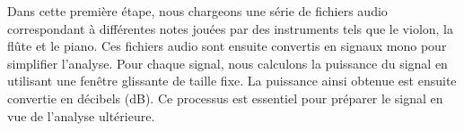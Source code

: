 
Dans cette première étape, nous chargeons une série de fichiers audio correspondant à différentes notes jouées par des instruments tels que le violon, la flûte et le piano. Ces fichiers audio sont ensuite convertis en signaux mono pour simplifier l'analyse. Pour chaque signal, nous calculons la puissance du signal en utilisant une fenêtre glissante de taille fixe. La puissance ainsi obtenue est ensuite convertie en décibels (dB). Ce processus est essentiel pour préparer le signal en vue de l'analyse ultérieure. 